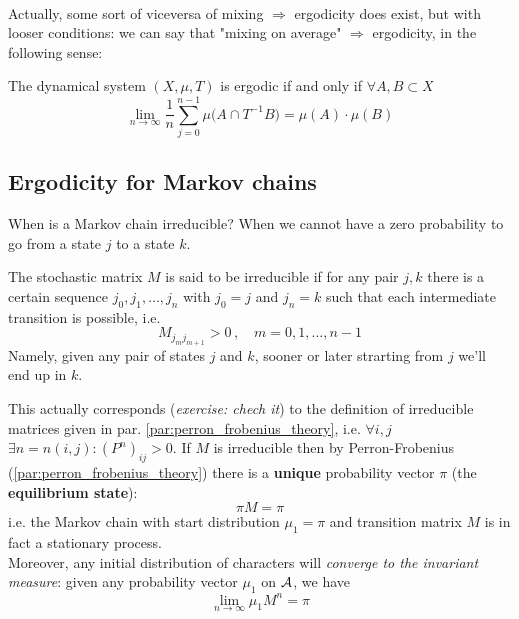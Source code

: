 \\Actually, some sort of viceversa of mixing $\Rightarrow$ ergodicity does exist, but with looser conditions: we can say that "mixing on average" $\Rightarrow$ ergodicity, in the following sense:
\begin{theorem}
    The dynamical system $(X, \mu, T)$ is ergodic if and only if $\forall A,B \subset X$ 
    \begin{equation}
        \lim_{n \rightarrow \infty} \frac{1}{n} \sum_{j=0}^{n-1} \mu \big( A  \cap T^{-1}B \big) = \mu(A) \cdot \mu(B)
    \end{equation}
\end{theorem}

\subsection{Ergodicity for Markov chains}
When is a Markov chain irreducible? When we cannot have a zero probability to go from a state $j$ to a state $k$.
\begin{definition}
    The stochastic matrix $M$ is said to be irreducible if for any pair $j,k$ there is a certain sequence $j_0, j_1, \dots, j_n$ with $j_0=j$ and $j_n=k$ such that each intermediate transition is possible, i.e. 
    \begin{equation}
        M_{j_m j_{m+1}} > 0 \,, \quad m = 0,1, \dots, n-1
    \end{equation}
    Namely, given any pair of states $j$ and $k$, sooner or later strarting from $j$ we'll end up in $k$.
\end{definition}
This actually corresponds (\textit{exercise: chech it}) to the definition of irreducible matrices given in par. \cref{par:perron_frobenius_theory}, i.e. $\forall i,j$ $\exists n = n(i,j) : (P^n)_{ij} > 0$.
If $M$ is irreducible then by Perron-Frobenius (\cref{par:perron_frobenius_theory}) there is a \textbf{unique} probability vector $\pi$ (the \textbf{equilibrium state}):
\begin{equation}
    \pi M = \pi
\end{equation}
i.e. the Markov chain with start distribution $\mu_1=\pi$ and transition matrix $M$ is in fact a stationary process. 
\\Moreover, any initial distribution of characters will \textit{converge to the invariant measure}: given any probability vector $\mu_1$ on $\mathcal{A}$, we have 
\begin{equation}
    \lim_{n \rightarrow \infty} \mu_1 M^n = \pi
\end{equation}
